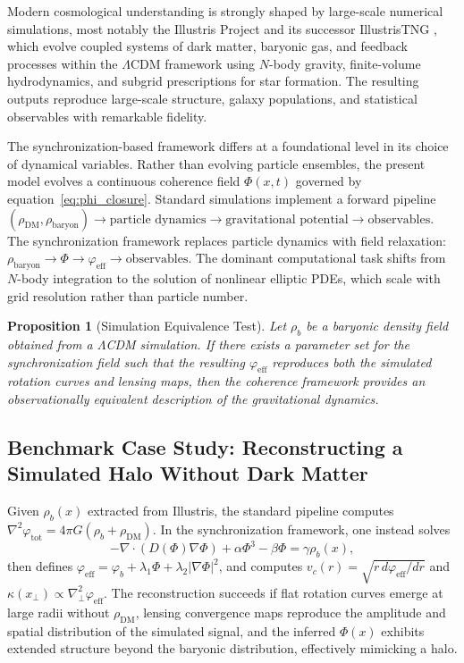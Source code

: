 \documentclass[11pt, a4paper, twocolumn]{article}
\newtheorem{proposition}[definition]{Proposition}
\begin{document}
Modern cosmological understanding is strongly shaped by large-scale numerical
simulations, most notably the Illustris Project and its successor IllustrisTNG
\cite{vogelsberger2014,nelson2018}, which evolve coupled systems of dark matter,
baryonic gas, and feedback processes within the $\Lambda$CDM framework using
$N$-body gravity, finite-volume hydrodynamics, and subgrid prescriptions for
star formation. The resulting outputs reproduce large-scale structure, galaxy
populations, and statistical observables with remarkable fidelity.

The synchronization-based framework differs at a foundational level in its
choice of dynamical variables. Rather than evolving particle ensembles, the
present model evolves a continuous coherence field $\Phi(x,t)$ governed by
equation~\eqref{eq:phi_closure}. Standard simulations implement a forward
pipeline $(\rho_{\mathrm{DM}},\rho_{\mathrm{baryon}}) \to \text{particle
dynamics} \to \text{gravitational potential} \to \text{observables}$. The
synchronization framework replaces particle dynamics with field relaxation:
$\rho_{\mathrm{baryon}} \to \Phi \to \varphi_{\mathrm{eff}} \to
\text{observables}$. The dominant computational task shifts from $N$-body
integration to the solution of nonlinear elliptic PDEs, which scale with grid
resolution rather than particle number.

\begin{proposition}[Simulation Equivalence Test]
Let $\rho_b$ be a baryonic density field obtained from a $\Lambda$CDM
simulation. If there exists a parameter set for the synchronization field such
that the resulting $\varphi_{\mathrm{eff}}$ reproduces both the simulated
rotation curves and lensing maps, then the coherence framework provides an
observationally equivalent description of the gravitational dynamics.
\end{proposition}

\subsection{Benchmark Case Study: Reconstructing a Simulated Halo Without Dark Matter}

Given $\rho_b(x)$ extracted from Illustris, the standard pipeline computes
$\nabla^2\varphi_{\mathrm{tot}} = 4\pi G(\rho_b + \rho_{\mathrm{DM}})$. In
the synchronization framework, one instead solves
\begin{equation}
-\nabla\cdot(D(\Phi)\nabla\Phi)
+
\alpha\Phi^3 - \beta\Phi
=
\gamma\rho_b(x),
\label{eq:phi_halo}
\end{equation}
then defines $\varphi_{\mathrm{eff}} = \varphi_b + \lambda_1\Phi +
\lambda_2|\nabla\Phi|^2$, and computes $v_c(r) =
\sqrt{r\,d\varphi_{\mathrm{eff}}/dr}$ and $\kappa(x_\perp) \propto
\nabla_\perp^2\varphi_{\mathrm{eff}}$. The reconstruction succeeds if flat
rotation curves emerge at large radii without $\rho_{\mathrm{DM}}$, lensing
convergence maps reproduce the amplitude and spatial distribution of the
simulated signal, and the inferred $\Phi(x)$ exhibits extended structure beyond
the baryonic distribution, effectively mimicking a halo.
\end{document}
